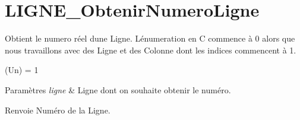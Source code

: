 \hypertarget{LIGNE_ObtenirNumeroLigne-example}{}\section{L\+I\+G\+N\+E\+\_\+\+Obtenir\+Numero\+Ligne}
Obtient le numero réel d\textquotesingle{}une Ligne. L\textquotesingle{}énumeration en C commence à 0 alors que nous travaillons avec des Ligne et des Colonne dont les indices commencent à 1.

(Un) = 1


\begin{DoxyParams}{Paramètres}
{\em ligne} & Ligne dont on souhaite obtenir le numéro.\\
\hline
\end{DoxyParams}
\begin{DoxyReturn}{Renvoie}
Numéro de la Ligne.
\end{DoxyReturn}

\begin{DoxyCodeInclude}
\end{DoxyCodeInclude}
 